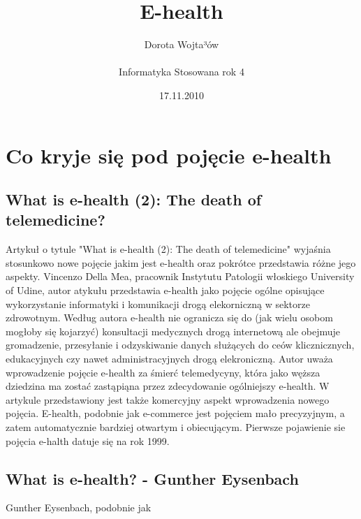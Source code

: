 \documentclass[a4paper,10pt]{article}
\begin{document}
\title{E-health}
 \author{ \LARGE Dorota Wojta³ów \\ \\ \Large Informatyka Stosowana rok 4}
\date{17.11.2010}
\maketitle
\section{ Co kryje się pod pojęcie e-health}
\subsection {What is e-health (2): The death of telemedicine?}
Artykuł o tytule "What is e-health (2): The death of telemedicine" wyjaśnia stosunkowo nowe pojęcie jakim jest e-health oraz pokrótce przedstawia
różne jego aspekty. Vincenzo Della Mea, pracownik Instytutu Patologii włoskiego University of Udine, autor atykułu przedstawia e-health jako pojęcie 
ogólne opisujące wykorzystanie informatyki i komunikacji drogą elekorniczną w sektorze zdrowotnym. Według autora e-health nie ogranicza się do (jak wielu osobom
mogłoby się kojarzyć)
konsultacji medycznych drogą internetową  ale obejmuje gromadzenie, przesyłanie i odzyskiwanie danych służących do ceów klicznicznych, edukacyjnych czy nawet administracyjnych drogą elekroniczną.
Autor uważa wprowadzenie pojęcie e-health  za śmierć telemedycyny, która jako węższa dziedzina ma zostać zastąpiąna przez zdecydowanie ogólniejszy e-health.
W artykule przedstawiony jest także komercyjny aspekt wprowadzenia nowego pojęcia. E-health, podobnie jak e-commerce jest pojęciem mało precyzyjnym, a zatem
automatycznie bardziej otwartym i obiecującym.
Pierwsze pojawienie sie pojęcia e-halth datuje się na rok 1999.

\subsection{What is e-health? - Gunther Eysenbach}
Gunther Eysenbach, podobnie jak 
\end{document}
